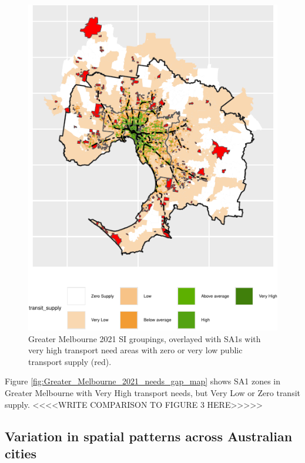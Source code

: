 \documentclass[preprint, 3p,
authoryear]{elsarticle} %
\begin{document}
\begin{figure}
\centering
\includegraphics{Leveraging_GTFS_to_assess_transit_supply_Transport_Geography_files/figure-latex/Greater_Melbourne_2021_needs_gap_map-1.pdf}
\caption{Greater Melbourne 2021 SI groupings, overlayed with SA1s with
very high transport need areas with zero or very low public transport
supply (red).}
\end{figure}

Figure \ref{fig:Greater_Melbourne_2021_needs_gap_map} shows SA1 zones in
Greater Melbourne with Very High transport needs, but Very Low or Zero
transit supply. \textless\textless\textless\textless WRITE COMPARISON TO
FIGURE 3
HERE\textgreater\textgreater\textgreater\textgreater\textgreater{}

\subsection{Variation in spatial patterns across Australian
cities}\label{variation-in-spatial-patterns-across-australian-cities}
\end{document}
